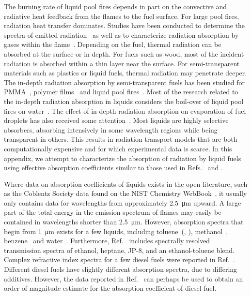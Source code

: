 The burning rate of liquid pool fires depends in part on the convective and radiative heat feedback from the flames to the fuel surface. For large pool fires, radiation heat transfer dominates. Studies have been conducted to determine the spectra of emitted radiation~\cite{Suo-Anttila:PCT2009} as well as to characterize radiation absorption by gases within the flame~\cite{Wakatsuki:CST2008}. Depending on the fuel, thermal radiation can be absorbed at the surface or in depth. For fuels such as wood, most of the incident radiation is absorbed within a thin layer near the surface. For semi-transparent materials such as plastics or liquid fuels, thermal radiation may penetrate deeper. The in-depth radiation absorption by semi-transparent fuels has been studied for PMMA~\cite{Stoliarov:CF2009}, polymer films~\cite{Tsilingiris:ECM2003} and liquid pool fires~\cite{Suo-Anttila:PCT2009}. Most of the research related to the in-depth radiation absorption in liquids considers the boil-over of liquid pool fires on water~\cite{Broeckmann:JLPPI1995}. The effect of in-depth radiation absorption on evaporation of fuel droplets has also received some attention~\cite{Sazhin:IJHMT2004b}. Most liquids are highly selective absorbers, absorbing intensively in some wavelength regions while being transparent in others. This results in radiation transport models that are both computationally expensive and for which experimental data is scarce. In this appendix, we attempt to characterize the absorption of radiation by liquid fuels using effective absorption coefficients similar to those used in Refs.~\cite{Madhav:IJMP1995} and \cite{Manohar:JHT1995}.

Where data on absorption coefficients of liquids exists in the open literature, such as the Coblentz Society data found on the NIST Chemistry WebBook~\cite{Coblentz:1}, it usually  only contains data for wavelengths from approximately \SI{2.5}{\micro m} upward. A large part of the total energy in the emission spectrum of flames may easily be contained in wavelengths shorter than \SI{2.5}{\micro m}. However, absorption spectra that begin from \SI{1}{\micro m} exists for a few liquids, including toluene~(\cite{Bertie:JMS2005}, \cite{Bertie:AS1994a}), methanol~\cite{Bertie:AS1993a}, benzene~\cite{Bertie:AS1993b} and water~\cite{Bertie:AS1996}. Furthermore, Ref.~\cite{Suo-Anttila:PCT2009} includes spectrally resolved transmission spectra of ethanol, heptane, JP-8, and an ethanol-toluene blend. Complex refractive index spectra for a few diesel fuels were reported in Ref.~\cite{Sazhin:IJHMT2004b}. Different diesel fuels have slightly different absorption spectra, due to differing additives. However, the data reported in Ref.~\cite{Sazhin:IJHMT2004b} can perhaps be used to obtain an order of magnitude estimate for the absorption coefficient of diesel fuel.

